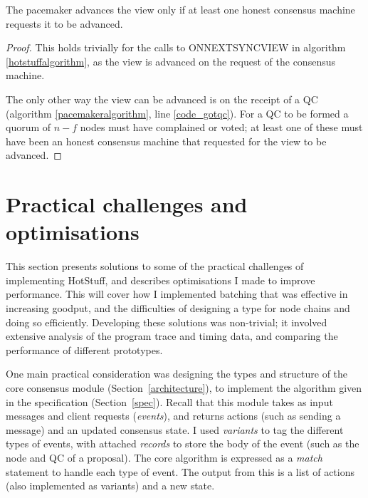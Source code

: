 \begin{theorem} \label{syncvalid}
	The pacemaker advances the view only if at least one honest consensus machine requests it to be advanced.
\end{theorem}

\begin{proof}
	This holds trivially for the calls to ON{\large N}EXT{\large S}YNC{\large V}IEW in algorithm \ref{hotstuffalgorithm}, as the view is advanced on the request of the consensus machine.

	The only other way the view can be advanced is on the receipt of a QC (algorithm \ref{pacemakeralgorithm}, line \ref{code_gotqc}). For a QC to be formed a quorum of $n - f$ nodes must have complained or voted; at least one of these must have been an honest consensus machine that requested for the view to be advanced.
\end{proof}

\section{Practical challenges and optimisations} \label{performance}

This section presents solutions to some of the practical challenges of implementing HotStuff, and describes optimisations I made to improve performance. This will cover how I implemented batching that was effective in increasing goodput, and the difficulties of designing a type for node chains and doing so efficiently. Developing these solutions was non-trivial; it involved extensive analysis of the program trace and timing data, and comparing the performance of different prototypes.

One main practical consideration was designing the types and structure of the core consensus module (Section~\ref{architecture}), to implement the algorithm given in the specification (Section~\ref{spec}). Recall that this module takes as input messages and client requests (\textit{events}), and returns actions (such as sending a message) and an updated consensus state. I used \textit{variants} to tag the different types of events, with attached \textit{records} to store the body of the event (such as the node and QC of a proposal). The core algorithm is expressed as a \textit{match} statement to handle each type of event. The output from this is a list of actions (also implemented as variants) and a new state.

